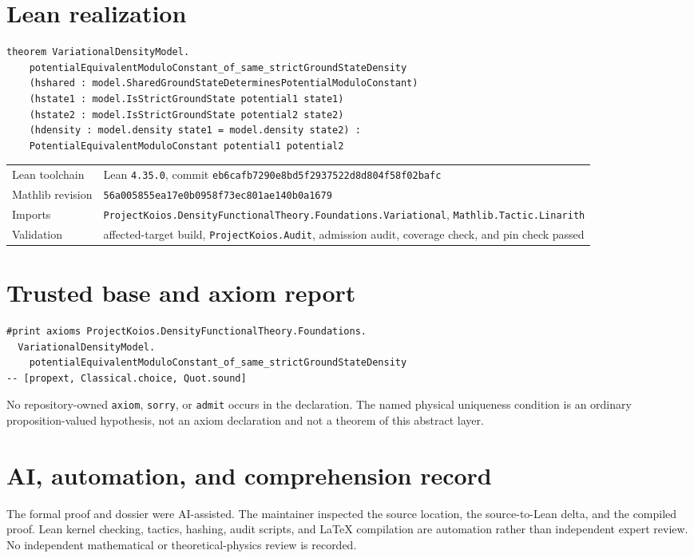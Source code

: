 \section{Lean realization}
\begin{lstlisting}
theorem VariationalDensityModel.
    potentialEquivalentModuloConstant_of_same_strictGroundStateDensity
    (hshared : model.SharedGroundStateDeterminesPotentialModuloConstant)
    (hstate1 : model.IsStrictGroundState potential1 state1)
    (hstate2 : model.IsStrictGroundState potential2 state2)
    (hdensity : model.density state1 = model.density state2) :
    PotentialEquivalentModuloConstant potential1 potential2
\end{lstlisting}
\begin{tabularx}{\textwidth}{@{}lY@{}}
\toprule
Lean toolchain & Lean \texttt{4.35.0}, commit \texttt{eb6cafb7290e8bd5f2937522d8d804f58f02bafc} \\
Mathlib revision & \texttt{56a005855ea17e0b0958f73ec801ae140b0a1679} \\
Imports & \texttt{ProjectKoios.DensityFunctionalTheory.Foundations.Variational}, \texttt{Mathlib.Tactic.Linarith} \\
Validation & affected-target build, \texttt{ProjectKoios.Audit}, admission audit, coverage check, and pin check passed \\
\bottomrule
\end{tabularx}

\section{Trusted base and axiom report}
\begin{lstlisting}
#print axioms ProjectKoios.DensityFunctionalTheory.Foundations.
  VariationalDensityModel.
    potentialEquivalentModuloConstant_of_same_strictGroundStateDensity
-- [propext, Classical.choice, Quot.sound]
\end{lstlisting}
No repository-owned \texttt{axiom}, \texttt{sorry}, or \texttt{admit} occurs in the declaration.
The named physical uniqueness condition is an ordinary proposition-valued hypothesis, not an axiom
declaration and not a theorem of this abstract layer.

\section{AI, automation, and comprehension record}
The formal proof and dossier were AI-assisted.  The maintainer inspected the source location, the
source-to-Lean delta, and the compiled proof.  Lean kernel checking, tactics, hashing, audit scripts,
and LaTeX compilation are automation rather than independent expert review.  No independent
mathematical or theoretical-physics review is recorded.

